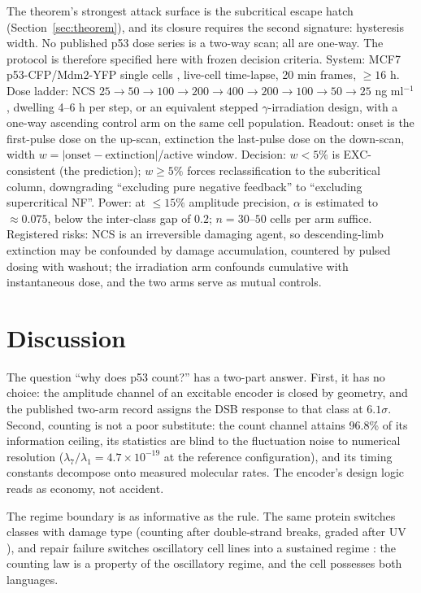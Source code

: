 \documentclass[11pt,a4paper]{article}
\begin{document}
The theorem's strongest attack surface is the subcritical escape hatch (Section~\ref{sec:theorem}), and its closure requires the second signature: hysteresis width. No published p53 dose series is a two-way scan; all are one-way. The protocol is therefore specified here with frozen decision criteria. System: MCF7 p53-CFP/Mdm2-YFP single cells \cite{Lahav2004}, live-cell time-lapse, 20 min frames, $\ge16$ h. Dose ladder: NCS $25\to50\to100\to200\to400\to200\to100\to50\to25$ ng ml$^{-1}$, dwelling 4--6 h per step, or an equivalent stepped $\gamma$-irradiation design, with a one-way ascending control arm on the same cell population. Readout: onset is the first-pulse dose on the up-scan, extinction the last-pulse dose on the down-scan, width $w=|\mathrm{onset}-\mathrm{extinction}|$/active window. Decision: $w<5\%$ is EXC-consistent (the prediction); $w\ge5\%$ forces reclassification to the subcritical column, downgrading ``excluding pure negative feedback'' to ``excluding supercritical NF''. Power: at $\le15\%$ amplitude precision, $\alpha$ is estimated to $\approx0.075$, below the inter-class gap of $0.2$; $n=30$--$50$ cells per arm suffice. Registered risks: NCS is an irreversible damaging agent, so descending-limb extinction may be confounded by damage accumulation, countered by pulsed dosing with washout; the irradiation arm confounds cumulative with instantaneous dose, and the two arms serve as mutual controls.

\section{Discussion}

The question ``why does p53 count?'' has a two-part answer. First, it has no choice: the amplitude channel of an excitable encoder is closed by geometry, and the published two-arm record assigns the DSB response to that class at $6.1\sigma$. Second, counting is not a poor substitute: the count channel attains 96.8\% of its information ceiling, its statistics are blind to the fluctuation noise to numerical resolution ($\lambda_7/\lambda_1=4.7\times10^{-19}$ at the reference configuration), and its timing constants decompose onto measured molecular rates. The encoder's design logic reads as economy, not accident.

The regime boundary is as informative as the rule. The same protein switches classes with damage type (counting after double-strand breaks, graded after UV \cite{Batchelor2011}), and repair failure switches oscillatory cell lines into a sustained regime \cite{StewartOrnstein2017}: the counting law is a property of the oscillatory regime, and the cell possesses both languages.
\end{document}
